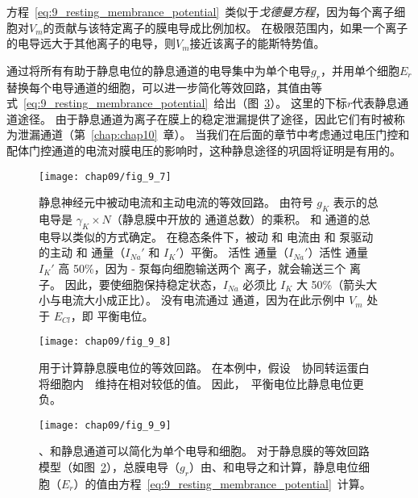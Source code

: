 \begin{proposition}[利用等效回路模型计算静息膜电位]
	\quad \quad 方程~\ref{eq:9_resting_membrance_potential}~类似于\textit{戈德曼方程}，因为每个离子细胞对$V_m$的贡献与该特定离子的膜电导成比例加权。
	在极限范围内，如果一个离子的电导远大于其他离子的电导，则$V_m$接近该离子的能斯特势值。
	
	\quad \quad 通过将所有有助于静息电位的静息通道的电导集中为单个电导$ g_r $，并用单个细胞$ E_r $替换每个电导通道的细胞，可以进一步简化等效回路，其值由等式~\ref{eq:9_resting_membrance_potential}~给出（图~\ref{fig:9_9}）。
	这里的下标$ r $代表静息通道途径。
	由于静息通道为离子在膜上的稳定泄漏提供了途径，因此它们有时被称为泄漏通道（第~\ref{chap:chap10}~章）。
	当我们在后面的章节中考虑通过电压门控和配体门控通道的电流对膜电压的影响时，这种静息途径的巩固将证明是有用的。
	
\end{proposition}


\begin{figure}[htbp]
	\centering
	\texttt{[image: chap09/fig\_9\_7]}
	\caption{静息神经元中被动电流和主动电流的等效回路。
		由符号 $ g_K $ 表示的总  电导是 $ \gamma_K \times N $（静息膜中开放的  通道总数）的乘积。
		 和  通道的总电导以类似的方式确定。
		在稳态条件下，被动  和  电流由 和 泵驱动的主动  和  通量（$I_{Na}'$ 和 $I_K'$）平衡。
		活性  通量（$I_{Na}'$）活性  通量 $I_K'$ 高 50\%，因为 - 泵每向细胞输送两个  离子，就会输送三个  离子。
		因此，要使细胞保持稳定状态，$I_{Na}$ 必须比 $ I_K $ 大 50\%（箭头大小与电流大小成正比）。
		没有电流通过  通道，因为在此示例中 $ V_m $ 处于 $ E_{Cl} $，即  平衡电位。
	}
	\label{fig:9_7}
\end{figure}


\begin{figure}[htbp]
	\centering
	\texttt{[image: chap09/fig\_9\_8]}
	\caption{用于计算静息膜电位的等效回路。
		在本例中，假设~~协同转运蛋白将细胞内~~维持在相对较低的值。
		因此，~平衡电位比静息电位更负。}
	\label{fig:9_8}
\end{figure}


\begin{figure}[htbp]
	\centering
	\texttt{[image: chap09/fig\_9\_9]}
	\caption{、和静息通道可以简化为单个电导和细胞。
		对于静息膜的等效回路模型（如图~\ref{fig:9_8}），总膜电导（$ g_r $）由、和电导之和计算，静息电位细胞（$ E_r $）的值由方程~\ref{eq:9_resting_membrance_potential}~计算。}
	\label{fig:9_9}
\end{figure}


